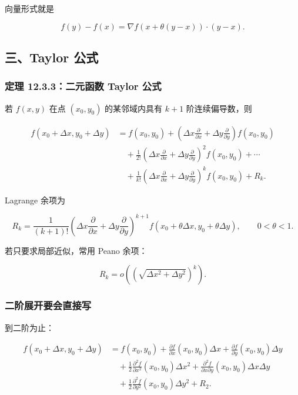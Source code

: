 向量形式就是

\[
      f(y)-f(x)=\nabla f(x+\theta(y-x))\cdot (y-x).
    \]

\subsection*{三、Taylor 公式}

\subsubsection*{定理 12.3.3：二元函数 Taylor 公式}

若 \(f(x,y)\) 在点 \((x_0,y_0)\) 的某邻域内具有 \(k+1\) 阶连续偏导数，则

\[
      \begin{aligned}
      f(x_0+\Delta x,y_0+\Delta y)
      &=
      f(x_0,y_0)
      +
      \left(\Delta x\frac{\partial}{\partial x}
      +\Delta y\frac{\partial}{\partial y}\right)f(x_0,y_0)\\
      &\quad+
      \frac{1}{2!}
      \left(\Delta x\frac{\partial}{\partial x}
      +\Delta y\frac{\partial}{\partial y}\right)^2f(x_0,y_0)
      +\cdots\\
      &\quad+
      \frac{1}{k!}
      \left(\Delta x\frac{\partial}{\partial x}
      +\Delta y\frac{\partial}{\partial y}\right)^k f(x_0,y_0)
      +R_k.
      \end{aligned}
    \]

Lagrange 余项为

\[
      R_k=
      \frac{1}{(k+1)!}
      \left(\Delta x\frac{\partial}{\partial x}
      +\Delta y\frac{\partial}{\partial y}\right)^{k+1}
      f(x_0+\theta\Delta x,y_0+\theta\Delta y),
      \qquad 0<\theta<1.
    \]

若只要求局部近似，常用 Peano 余项：

\[
      R_k=o\!\left(\left(\sqrt{\Delta x^2+\Delta y^2}\right)^k\right).
    \]

\subsubsection*{二阶展开要会直接写}

到二阶为止：

\[
      \begin{aligned}
      f(x_0+\Delta x,y_0+\Delta y)
      &=
      f(x_0,y_0)
      +
      \frac{\partial f}{\partial x}(x_0,y_0)\Delta x
      +
      \frac{\partial f}{\partial y}(x_0,y_0)\Delta y\\
      &\quad+
      \frac12\frac{\partial^2 f}{\partial x^2}(x_0,y_0)\Delta x^2
      +
      \frac{\partial^2 f}{\partial x\partial y}(x_0,y_0)\Delta x\Delta y\\
      &\quad+
      \frac12\frac{\partial^2 f}{\partial y^2}(x_0,y_0)\Delta y^2
      +R_2.
      \end{aligned}
    \]


